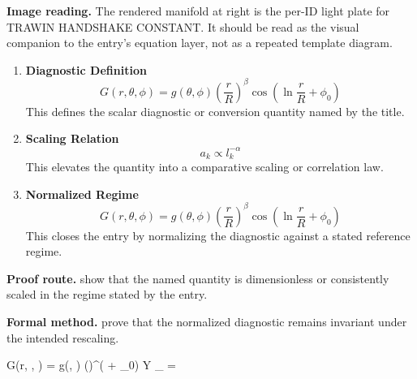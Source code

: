 \begin{samepage}
\noindent\begin{minipage}[t]{0.45\linewidth}
\vspace{0pt}
\raggedright
\scriptsize\textbf{Image reading.} The rendered manifold at right is the per-ID light plate for TRAWIN HANDSHAKE CONSTANT. It should be read as the visual companion to the entry's equation layer, not as a repeated template diagram.\par
\end{minipage}\hfill
\begin{minipage}[t]{0.53\linewidth}
\vspace*{-0.10in}
\raggedright
{}
\end{minipage}
\end{samepage}

\clearpage


\begin{enumerate}[leftmargin=1.6em,itemsep=9pt,topsep=6pt]
\item \textbf{Diagnostic Definition}
\[
G(r, \theta, \phi) = g(\theta, \phi) \left(\frac{r}{R}\right)^\beta \cos(\ln \frac{r}{R} + \phi_0)
\]
This defines the scalar diagnostic or conversion quantity named by the title.

\item \textbf{Scaling Relation}
\[
a_k \propto l_k^{-\alpha}
\]
This elevates the quantity into a comparative scaling or correlation law.

\item \textbf{Normalized Regime}
\[
G(r, \theta, \phi) = g(\theta, \phi) \left(\frac{r}{R}\right)^\beta \cos(\ln \frac{r}{R} + \phi_0)
\]
This closes the entry by normalizing the diagnostic against a stated reference regime.
\end{enumerate}

\textbf{Proof route.} show that the named quantity is dimensionless or consistently scaled in the regime stated by the entry.

\textbf{Formal method.} prove that the normalized diagnostic remains invariant under the intended rescaling.

\medskip
{}

\begin{tzpsnapshot}
\end{tzpsnapshot}

\tzpequationlinks
  {G(r, \theta, \phi) = g(\theta, \phi) \left(\right)^\beta \cos(\ln {} + \phi_0)}
  {Y \propto \cdots}
  {\widehat{\Pi}_{} = \cdots}
